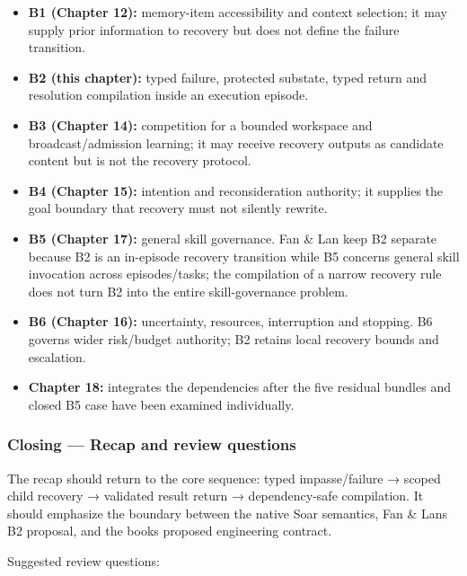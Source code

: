 \begin{itemize}
\tightlist
\item
  \textbf{B1 (Chapter 12):} memory-item accessibility and context selection; it may supply prior information to recovery but does not define the failure transition.
\item
  \textbf{B2 (this chapter):} typed failure, protected substate, typed return and resolution compilation inside an execution episode.
\item
  \textbf{B3 (Chapter 14):} competition for a bounded workspace and broadcast/admission learning; it may receive recovery outputs as candidate content but is not the recovery protocol.
\item
  \textbf{B4 (Chapter 15):} intention and reconsideration authority; it supplies the goal boundary that recovery must not silently rewrite.
\item
  \textbf{B5 (Chapter 17):} general skill governance. Fan \& Lan keep B2 separate because B2 is an in-episode recovery transition while B5 concerns general skill invocation across episodes/tasks; the compilation of a narrow recovery rule does not turn B2 into the entire skill-governance problem.
\item
  \textbf{B6 (Chapter 16):} uncertainty, resources, interruption and stopping. B6 governs wider risk/budget authority; B2 retains local recovery bounds and escalation.
\item
  \textbf{Chapter 18:} integrates the dependencies after the five residual bundles and closed B5 case have been examined individually.
\end{itemize}

\subsubsection{Closing --- Recap and review questions}\label{closing--recap-and-review-questions}

The recap should return to the core sequence: typed impasse/failure → scoped child recovery → validated result return → dependency-safe compilation. It should emphasize the boundary between the native Soar semantics, Fan \& Lan\textquotesingle s B2 proposal, and the book\textquotesingle s proposed engineering contract.

Suggested review questions:

